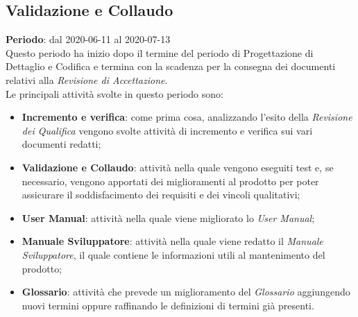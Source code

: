 \subsection{Validazione e Collaudo}
\textbf{Periodo}: dal 2020-06-11 al 2020-07-13 \\
Questo periodo ha inizio dopo il termine del periodo di Progettazione di Dettaglio e Codifica e termina con la scadenza per la consegna dei documenti relativi alla \textit{Revisione di Accettazione}. \\
Le principali attività svolte in questo periodo sono:
\begin{itemize}
	\item \textbf{Incremento e verifica}: come prima cosa, analizzando l'esito della \textit{Revisione dei Qualifica} vengono svolte attività di incremento e verifica sui vari documenti redatti;
	\item \textbf{Validazione e Collaudo}: attività nella quale vengono eseguiti test e, se necessario, vengono apportati dei miglioramenti al prodotto per poter assicurare il soddisfacimento dei requisiti e dei vincoli qualitativi;
	\item \textbf{User Manual}: attività nella quale viene migliorato lo \textit{User Manual};
	\item \textbf{Manuale Sviluppatore}: attività nella quale viene redatto il \textit{Manuale Sviluppatore}, il quale contiene le informazioni utili al mantenimento del prodotto;
	\item \textbf{Glossario}: attività che prevede un miglioramento del \textit{Glossario} aggiungendo nuovi termini oppure raffinando le definizioni di termini già presenti.
\end{itemize}
